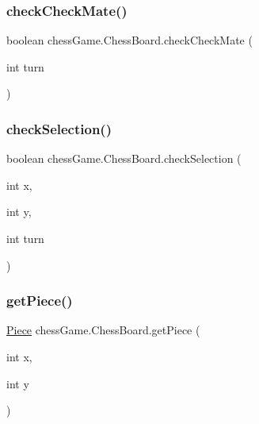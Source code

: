 \hypertarget{classchess_game_1_1_chess_board_ac6925c5d6c7d25cef9b657b867d136f5}{}\label{classchess_game_1_1_chess_board_ac6925c5d6c7d25cef9b657b867d136f5} 
\subsubsection{\texorpdfstring{check\+Check\+Mate()}{checkCheckMate()}}
{\footnotesize\ttfamily boolean chess\+Game.\+Chess\+Board.\+check\+Check\+Mate (\begin{DoxyParamCaption}\item[{int}]{turn }\end{DoxyParamCaption})}

\hypertarget{classchess_game_1_1_chess_board_a09726ab6e513a982fe2a0bec12ec4da7}{}\label{classchess_game_1_1_chess_board_a09726ab6e513a982fe2a0bec12ec4da7} 
\subsubsection{\texorpdfstring{check\+Selection()}{checkSelection()}}
{\footnotesize\ttfamily boolean chess\+Game.\+Chess\+Board.\+check\+Selection (\begin{DoxyParamCaption}\item[{int}]{x,  }\item[{int}]{y,  }\item[{int}]{turn }\end{DoxyParamCaption})}

\hypertarget{classchess_game_1_1_chess_board_aca77ba8af70e7dffc7a48622adcd5ee9}{}\label{classchess_game_1_1_chess_board_aca77ba8af70e7dffc7a48622adcd5ee9} 
\subsubsection{\texorpdfstring{get\+Piece()}{getPiece()}}
{\footnotesize\ttfamily \hyperlink{classchess_game_1_1_piece}{Piece} chess\+Game.\+Chess\+Board.\+get\+Piece (\begin{DoxyParamCaption}\item[{int}]{x,  }\item[{int}]{y }\end{DoxyParamCaption})}

